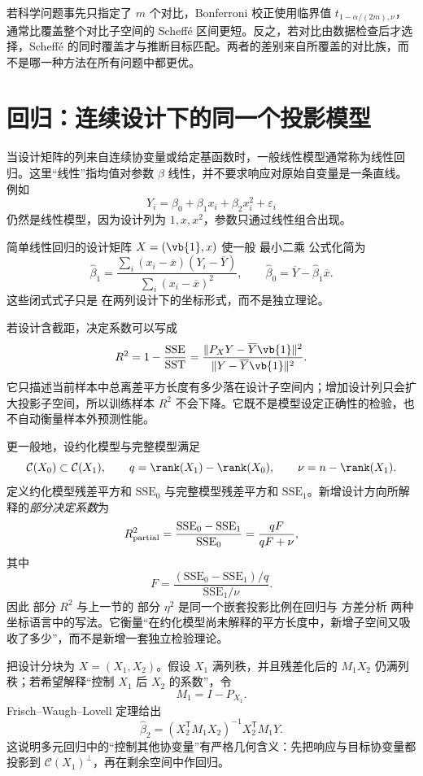 若科学问题事先只指定了 $m$ 个对比，Bonferroni 校正使用临界值 $t_{1-\alpha/(2m),\nu}$，通常比覆盖整个对比子空间的 Scheffé 区间更短。反之，若对比由数据检查后才选择，Scheffé 的同时覆盖才与推断目标匹配。两者的差别来自所覆盖的对比族，而不是哪一种方法在所有问题中都更优。

\section{回归：连续设计下的同一个投影模型}

当设计矩阵的列来自连续协变量或给定基函数时，一般线性模型通常称为线性回归。这里“线性”指均值对参数 $\beta$ 线性，并不要求响应对原始自变量是一条直线。例如
\[
 Y_i=\beta_0+\beta_1x_i+\beta_2x_i^2+\varepsilon_i
\]
仍然是线性模型，因为设计列为 $1,x,x^2$，参数只通过线性组合出现。

简单线性回归的设计矩阵 $X=(\vb{1},x)$ 使一般 最小二乘 公式化简为
\[
 \widehat\beta_1
 =\frac{\sum_i(x_i-\overline x)(Y_i-\overline Y)}
 {\sum_i(x_i-\overline x)^2},
 \qquad
 \widehat\beta_0
 =\overline Y-\widehat\beta_1\overline x.
\]
这些闭式式子只是 在两列设计下的坐标形式，而不是独立理论。

若设计含截距，决定系数可以写成
\[
 R^2
 =1-\frac{\mathrm{SSE}}{\mathrm{SST}}
 =\frac{\|P_XY-\overline Y\vb{1}\|^2}
 {\|Y-\overline Y\vb{1}\|^2}.
\]
它只描述当前样本中总离差平方长度有多少落在设计子空间内；增加设计列只会扩大投影子空间，所以训练样本 $R^2$ 不会下降。它既不是模型设定正确性的检验，也不自动衡量样本外预测性能。

更一般地，设约化模型与完整模型满足
\[
 \mathcal C(X_0)\subset\mathcal C(X_1),
 \qquad
 q=\rank(X_1)-\rank(X_0),
 \qquad
 \nu=n-\rank(X_1).
\]
定义约化模型残差平方和 $\mathrm{SSE}_0$ 与完整模型残差平方和 $\mathrm{SSE}_1$。新增设计方向所解释的\emph{部分决定系数}为
\begin{equation*}R^2_{\rm partial}
 =\frac{\mathrm{SSE}_0-\mathrm{SSE}_1}{\mathrm{SSE}_0}
 =\frac{qF}{qF+\nu},
\end{equation*}
其中
\[
 F
 =\frac{(\mathrm{SSE}_0-\mathrm{SSE}_1)/q}{\mathrm{SSE}_1/\nu}.
\]
因此 部分 $R^2$ 与上一节的 部分 $\eta^2$ 是同一个嵌套投影比例在回归与 方差分析 两种坐标语言中的写法。它衡量“在约化模型尚未解释的平方长度中，新增子空间又吸收了多少”，而不是新增一套独立检验理论。

\begin{theorem}
\label{thm:math-linear-fwl}
把设计分块为 $X=(X_1,X_2)$。假设 $X_1$ 满列秩，并且残差化后的 $M_1X_2$ 仍满列秩；若希望解释“控制 $X_1$ 后 $X_2$ 的系数”，令
\[
 M_1=I-P_{X_1}.
\]
Frisch--Waugh--Lovell 定理给出
\begin{equation}\label{eq:math-stat-fwl}
 \widehat\beta_2
 =(X_2^{\mathsf T}M_1X_2)^{-1}
 X_2^{\mathsf T}M_1Y.
\end{equation}
这说明多元回归中的“控制其他协变量”有严格几何含义：先把响应与目标协变量都投影到 $\mathcal C(X_1)^\perp$，再在剩余空间中作回归。
\end{theorem}


